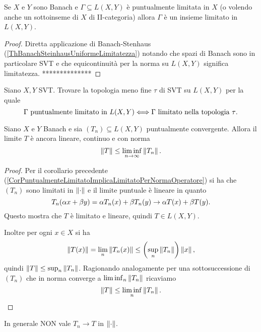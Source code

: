 \begin{corollary}\label{CorPuntualmenteLimitatoImplicaLimitatoPerNormaOperatore}
    Se $X$ e $Y$ sono Banach e $\Gamma\subseteq L(X,Y)$ \`e puntualmente limitata in $X$ (o volendo anche un sottoinseme di $X$ di II-categoria) allora $\Gamma$ \`e un insieme limitato in $L(X,Y)$.
\end{corollary}
\begin{proof}
Diretta applicazione di Banach-Stenhaus (\ref{ThBanachSteinhausUniformeLimitatezza}) notando che spazi di Banach sono in particolare SVT e che equicontinuit\`a per la norma su $L(X,Y)$ significa limitatezza. **************
\end{proof}

\begin{exercise}
Siano $X,Y$ SVT. Trovare la topologia meno fine $\tau$ di SVT su $L(X,Y)$ per la quale
\[\Gamma\text{ puntualmente limitato in $L(X,Y)$}\Longleftrightarrow \Gamma\text{ limitato nella topologia $\tau$}.\]
\end{exercise}


\begin{corollary}\label{CorConvergenzaLineariSePuntualmenteConvergente}
Siano $X$ e $Y$ Banach e sia $(T_n)\subseteq L(X,Y)$ puntualmente convergente. Allora il limite $T$ \`e ancora lineare, continuo e con norma
\[\left\Vert{T}\right\Vert\leq \liminf_{n\to\infty}\left\Vert{T_n}\right\Vert.\]
\end{corollary}
\begin{proof}
Per il corollario precedente (\ref{CorPuntualmenteLimitatoImplicaLimitatoPerNormaOperatore}) si ha che $(T_n)$ sono limitati in ${\left\Vert{\cdot}\right\Vert}$ e il limite puntuale \`e lineare in quanto
\[T_n(\alpha x+\beta y)=\alpha T_n(x)+\beta T_n(y)\to \alpha T(x)+\beta T(y).\]
Questo mostra che $T$ \`e limitato e lineare, quindi $T\in L(X,Y)$.

Inoltre per ogni $x\in X$ si ha
\[\left\Vert{T(x)}\right\Vert=\lim_{n}\left\Vert{T_n(x)}\right\Vert\leq \left({\sup_n\left\Vert{T_n}\right\Vert}\right)\left\Vert{x}\right\Vert,\]
quindi $\left\Vert{T}\right\Vert\leq \sup_n\left\Vert{T_n}\right\Vert$. Ragionando analogamente per una sottosuccessione di $(T_n)$ che in norma converge a $\liminf_n\left\Vert{T_n}\right\Vert$ ricaviamo
\[\left\Vert{T}\right\Vert\leq \liminf_n\left\Vert{T_n}\right\Vert.\]
\end{proof}

\begin{remark}
In generale NON vale $T_n\to T$ in ${\left\Vert{\cdot}\right\Vert}$.
\end{remark}

